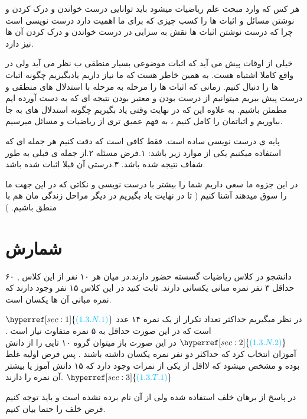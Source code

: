 \documentclass[11pt,largemargins]{h2wp}
\begin{document}
\maketitle

هر کس که وارد مبحث علم ریاضیات میشود باید توانایی درست خواندن و درک کردن و نوشتن مسائل و اثبات ها را کسب 
چیزی که برای ما اهمیت دارد درست نویسی است چرا که درست نوشتن اثبات ها نقش به سزایی در درست خواندن و درک کردن آن ها نیز دارد.

خیلی از اوقات پیش می آید که اثبات موضوعی بسیار منطقی ب نظر می آید ولی در واقع کاملا اشتباه هست. 
به همین خاطر هست که ما نیاز داریم یادبگیریم چگونه اثبات ها را دنبال کنیم.
زمانی که اثبات ها را مرحله به مرحله با استدلال های منطقی و درست پیش ببریم میتوانیم از درست بودن و معتبر بودن نتیجه ای که به دست آورده ایم مطمئن باشیم.
به علاوه این که در نهایت وقتی یاد بگیریم چگونه استدلال های به جا بیاوریم و اثباتمان را کامل کنیم ، به فهم عمیق تری از ریاضیات و مسائل میرسیم.

پایه ی درست نویسی ساده است.
فقط کافی است که دقت کنیم هر جمله ای که استفاده میکنیم یکی از موارد زیر باشد:
۱.فرض مسئله
۲.از جمله ی قبلی به طور شفاف نتیجه شده باشد.
۳.درستی آن قبلا اثبات شده باشد.

در این جزوه ما سعی داریم شما را بیشتر با درست نویسی و نکاتی که در این جهت ما را سوق میدهند آشنا کنیم ( تا در نهایت یاد بگیریم در دیگر مراحل زندگی مان هم با منطق باشیم. )

\chapter*{شمارش}

\question
\question

\question
۶۰ دانشجو در کلاس ریاضیات گسسته حضور دارند.در میان هر ۱۰ نفر از این کلاس , حداقل ۳ نفر نمره مبانی یکسانی دارند. ثابت کنید در این کلاس ۱۵ نفر وجود دارند که نمره مبانی آن ها یکسان است.

\solution
$ \hyperref[sec:1]{\textcolor{capri}{(1.3.N.1)}} $
در نظر میگیریم حداکثر تعداد تکرار از یک نمره ۱۴ عدد است که در این صورت حداقل به ۵ نمره متفاوت نیاز است . 
 $ \hyperref[sec:2]{\textcolor{capri}{(1.3.N.2)}} $
در این صورت باز میتوان گروه ۱۰ تایی را از دانش آموزان انتخاب کرد که حداکثر دو نفر نمره یکسان داشته باشند . پس فرض اولیه غلط بوده و مشخص میشود که لااقل از یکی از نمرات وجود دارد که ۱۵ دانش آموز یا بیشتر 
آن نمره را دارند.
 $ \hyperref[sec:3]{\textcolor{capri}{(1.3.T.1)}}  $


\notes

\Nnote
در پاسخ از برهان خلف استفاده شده ولی از آن نام برده نشده است و باید توجه کنیم فرض خلف را حتما بیان کنیم.
\label{sec:1}
\end{document}
